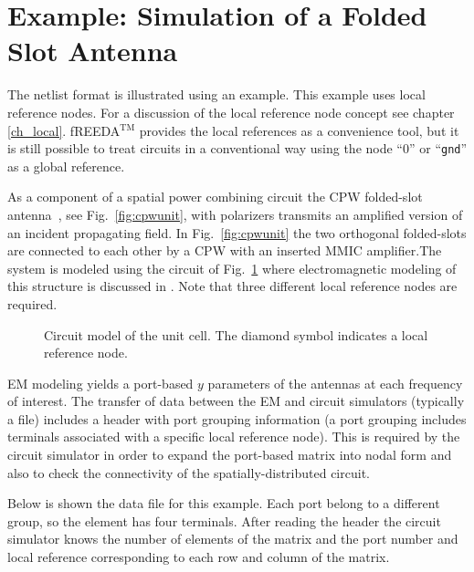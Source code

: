 \section{Example: Simulation of a Folded Slot Antenna}

The netlist format is illustrated using an example. This example uses
local reference nodes. For a discussion of the local reference node
concept see chapter \ref{ch_local}. fREEDA$^{\mathrm{TM}}$ provides the local
references as a convenience tool, but it is still possible to treat
circuits in a conventional way using the node ``0'' or ``{\tt gnd}''
as a global reference.

As a component of a spatial power combining circuit the CPW
folded-slot antenna~\cite{rodwell}, see Fig.~\ref{fig:cpwunit}, with
polarizers transmits an amplified version of an incident propagating
field. In Fig.~\ref{fig:cpwunit} the two orthogonal folded-slots are
connected to each other by a CPW with an inserted MMIC amplifier.The
system is modeled using the circuit of Fig.~\ref{fig:cpwcircuit} where
electromagnetic modeling of this structure is discussed in
\cite{steer:abdullah:1998,mostafa,usman}. Note that three different
local reference nodes are required.
%
\begin{figure*}
\centerline{\epsfxsize=10cm }
\caption{Unit cell of the CPW antenna array.} \label{fig:cpwunit}
\end{figure*}
%
\begin{figure}
\centerline{\epsfxsize=9cm }
\caption{Circuit model of the unit cell. The diamond symbol indicates
a local reference node.} \label{fig:cpwcircuit}
\end{figure}
%
EM modeling yields a port-based $y$ parameters of the antennas at each
frequency of interest. The transfer of data between the EM and circuit
simulators (typically a file) includes a header with port grouping
information (a port grouping includes terminals associated with a
specific local reference node). This is required by the circuit
simulator in order to expand the port-based matrix into nodal form and
also to check the connectivity of the spatially-distributed circuit.

Below is shown the data file for this example. Each port belong to a
different group, so the element has four terminals. After reading the
header the circuit simulator knows the number of elements of the
matrix and the port number and local reference corresponding to each
row and column of the matrix.

